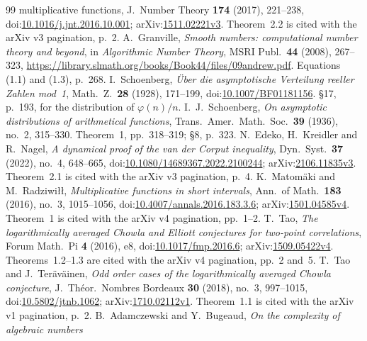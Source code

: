 \begin{thebibliography}{99}
{multiplicative functions}, J.\ Number Theory \textbf{174} (2017), 221--238,
doi:\href{https://doi.org/10.1016/j.jnt.2016.10.001}{10.1016/j.jnt.2016.10.001};
arXiv:\href{https://arxiv.org/abs/1511.02221v3}{1511.02221v3}.
Theorem~2.2 is cited with the arXiv v3 pagination, p.~2.
A.~Granville, \emph{Smooth numbers: computational number theory and beyond},
in \emph{Algorithmic Number Theory}, MSRI Publ.\ \textbf{44} (2008), 267--323,
\url{https://library.slmath.org/books/Book44/files/09andrew.pdf}.
Equations (1.1) and (1.3), p.~268.
I.~Schoenberg, \emph{\"Uber die asymptotische Verteilung reeller Zahlen
mod~1}, Math.\ Z.\ \textbf{28} (1928), 171--199,
doi:\href{https://doi.org/10.1007/BF01181156}{10.1007/BF01181156}.
\S17, p.~193, for the distribution of $\varphi(n)/n$.
I.~J.~Schoenberg, \emph{On asymptotic distributions of arithmetical
functions}, Trans.\ Amer.\ Math.\ Soc.\ \textbf{39} (1936), no.~2, 315--330.
Theorem~1, pp.~318--319; \S8, p.~323.
N.~Edeko, H.~Kreidler and R.~Nagel, \emph{A dynamical proof of the van der
Corput inequality}, Dyn.\ Syst.\ \textbf{37} (2022), no.~4, 648--665,
doi:\href{https://doi.org/10.1080/14689367.2022.2100244}{10.1080/14689367.2022.2100244};
arXiv:\href{https://arxiv.org/abs/2106.11835v3}{2106.11835v3}.
Theorem~2.1 is cited with the arXiv v3 pagination, p.~4.
K.~Matom\"aki and M.~Radziwi\l\l, \emph{Multiplicative functions in short
intervals}, Ann.\ of Math.\ \textbf{183} (2016), no.~3, 1015--1056,
doi:\href{https://doi.org/10.4007/annals.2016.183.3.6}{10.4007/annals.2016.183.3.6};
arXiv:\href{https://arxiv.org/abs/1501.04585v4}{1501.04585v4}.
Theorem~1 is cited with the arXiv v4 pagination, pp.~1--2.
T.~Tao, \emph{The logarithmically averaged Chowla and Elliott conjectures for
two-point correlations}, Forum Math.\ Pi \textbf{4} (2016), e8,
doi:\href{https://doi.org/10.1017/fmp.2016.6}{10.1017/fmp.2016.6};
arXiv:\href{https://arxiv.org/abs/1509.05422v4}{1509.05422v4}.
Theorems~1.2--1.3 are cited with the arXiv v4 pagination, pp.~2 and~5.
T.~Tao and J.~Ter\"av\"ainen, \emph{Odd order cases of the logarithmically
averaged Chowla conjecture}, J.\ Th\'eor.\ Nombres Bordeaux \textbf{30}
(2018), no.~3, 997--1015,
doi:\href{https://doi.org/10.5802/jtnb.1062}{10.5802/jtnb.1062};
arXiv:\href{https://arxiv.org/abs/1710.02112v1}{1710.02112v1}.
Theorem~1.1 is cited with the arXiv v1 pagination, p.~2.
B.~Adamczewski and Y.~Bugeaud, \emph{On the complexity of algebraic numbers
}
\end{thebibliography}
